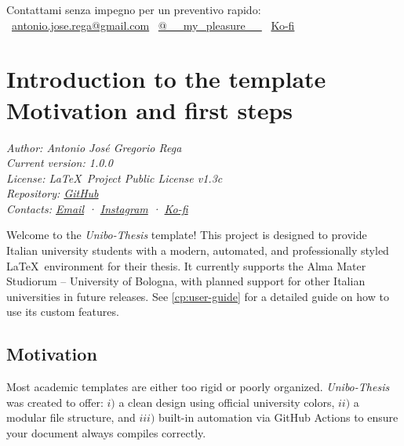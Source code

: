 {	\begin{block}[tip]
		Contattami senza impegno per un preventivo rapido: \\
		\faEnvelope\ \href{mailto:antonio.jose.rega@gmail.com}{antonio.jose.rega@gmail.com} \quad
		\faInstagram\ \href{https://www.instagram.com/__my_pleasure__}{@\_\_my\_pleasure\_\_} \quad
		\faHeart\ \href{https://ko-fi.com/antoniojosegregoriorega}{Ko-fi}
	\end{block}
	
}{%
	\chapter[Introduction to the template: motivation and first steps]{Introduction to the template\\Motivation and first steps}
	\label{cp:introduction}
	
	{
		\newpage
		\parindent0pt
		\textit{Author: Antonio José Gregorio Rega} \\
		\textit{Current version: 1.0.0} \\
		\textit{License: \LaTeX~Project Public License v1.3c} \\
		\textit{Repository: \href{https://github.com/antoniojoserega/unibo-thesis}{GitHub}} \\
		\textit{Contacts: \href{mailto:antonio.jose.rega@gmail.com}{Email} · \href{https://www.instagram.com/__my_pleasure__}{Instagram} · \href{https://ko-fi.com/antoniojosegregoriorega}{Ko-fi}}
		
		\vspace{.935em}
		
		Welcome to the \textcolor{maincolor}{\textit{Unibo-Thesis}} template! This project is designed to provide Italian university students with a modern, automated, and professionally styled \LaTeX\ environment for their thesis. It currently supports the Alma Mater Studiorum -- University of Bologna, with planned support for other Italian universities in future releases. See \autoref{cp:user-guide} for a detailed guide on how to use its custom features.
	}
	
	\section{Motivation}
	Most academic templates are either too rigid or poorly organized. \textit{Unibo-Thesis} was created to offer: \(i)\) a clean design using official university colors, \(ii)\) a modular file structure, and \(iii)\) built-in automation via GitHub Actions to ensure your document always compiles correctly.
	
}
